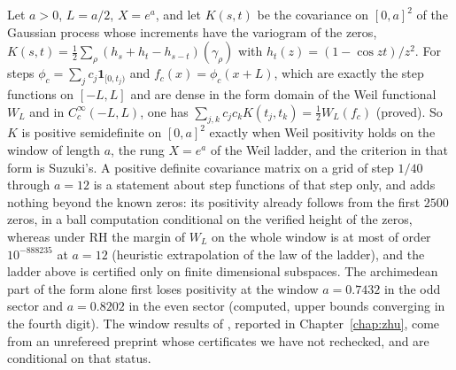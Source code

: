 \begin{remark}\label{route:rem:gp}
Let $a>0$, $L=a/2$, $X=e^a$, and let $K(s,t)$ be the covariance on $[0,a]^2$ of the Gaussian process whose increments have the variogram of the zeros, $K(s,t)=\frac12\sum_\rho(h_s+h_t-h_{s-t})(\gamma_\rho)$ with $h_t(z)=(1-\cos zt)/z^2$. For steps $\phi_c=\sum_jc_j\mathbf 1_{[0,t_j)}$ and $f_c(x)=\phi_c(x+L)$, which are exactly the step functions on $[-L,L]$ and are dense in the form domain of the Weil functional $W_L$ and in $C_c^\infty(-L,L)$, one has $\sum_{j,k}c_jc_kK(t_j,t_k)=\frac12W_L(f_c)$ (proved). So $K$ is positive semidefinite on $[0,a]^2$ exactly when Weil positivity holds on the window of length $a$, the rung $X=e^a$ of the Weil ladder, and the criterion in that form is Suzuki's. %
A positive definite covariance matrix on a grid of step $1/40$ through $a=12$ is a statement about step functions of that step only, and adds nothing beyond the known zeros: its positivity already follows from the first $2500$ zeros, in a ball computation conditional on the verified height of the zeros, whereas under RH the margin of $W_L$ on the whole window is at most of order $10^{-888235}$ at $a=12$ (heuristic extrapolation of the law of the ladder), and the ladder above is certified only on finite dimensional subspaces. The archimedean part of the form alone first loses positivity at the window $a=0.7432$ in the odd sector and $a=0.8202$ in the even sector (computed, upper bounds converging in the fourth digit). The window results of \cite{Zhu26}, reported in Chapter~\ref{chap:zhu}, come from an unrefereed preprint whose certificates we have not rechecked, and are conditional on that status.
\end{remark}

